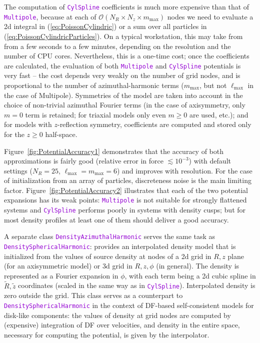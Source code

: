 \documentclass[12pt]{article}
\newcommand{\ttt}[1]{\textcolor{darkviolet}{\texttt{#1}}}
\begin{document}
The computation of \ttt{CylSpline} coefficients is much more expensive than that of \ttt{Multipole}, because at each of $\mathcal{O}(N_R\times N_z \times m_\mathrm{max})$ nodes we need to evaluate a 2d integral in (\ref{eq:PoissonCylindric}) or a sum over all particles in (\ref{eq:PoissonCylindricParticles}). On a typical workstation, this may take from from a few seconds to a few minutes, depending on the resolution and the number of CPU cores. Nevertheless, this is a one-time cost; once the coefficients are calculated, the evaluation of both \ttt{Multipole} and \ttt{CylSpline} potentials is very fast -- the cost depends very weakly on the number of grid nodes, and is proportional to the number of azimuthal-harmonic terms ($m_\mathrm{max}$, but not $\ell_\mathrm{max}$ in the case of Multipole).
Symmetries of the model are taken into account in the choice of non-trivial azimuthal Fourier terms (in the case of axisymmetry, only $m=0$ term is retained; for triaxial models only even $m\ge 0$ are used, etc.); and for models with $z$-reflection symmetry, coefficients are computed and stored only for the $z\ge 0$ half-space.

Figure~\ref{fig:PotentialAccuracy1} demonstrates that the accuracy of both approximations is fairly good (relative error in force $\lesssim 10^{-3}$) with default settings ($N_R=25$, $\ell_\mathrm{max}=m_\mathrm{max}=6$) and improves with resolution. For the case of initialization from an array of particles, discreteness noise is the main limiting factor.
Figure~\ref{fig:PotentialAccuracy2} illustrates that each of the two potential expansions has its weak points: \ttt{Multipole} is not suitable for strongly flattened systems and \ttt{CylSpline} performs poorly in systems with density cusps; but for most density profiles at least one of them should deliver a good accuracy.

\label{sec:DensityAzimuthalHarmonic} A separate class \ttt{DensityAzimuthalHarmonic} serves the same task as \ttt{Density\-Spherical\-Harmonic}: provides an interpolated density model that is initialized from the values of source density at nodes of a 2d grid in $R,z$ plane (for an axisymmetric model) or 3d grid in $R,z,\phi$ (in general). The density is represented as a Fourier expansion in $\phi$, with each term being a 2d cubic spline in $\tilde R, \tilde z$ coordinates (scaled in the same way as in \ttt{CylSpline}). Interpolated density is zero outside the grid. This class serves as a counterpart to \ttt{DensitySphericalHarmonic} in the context of DF-based self-consistent models for disk-like components: the values of density at grid nodes are computed by (expensive) integration of DF over velocities, and density in the entire space, necessary for computing the potential, is given by the interpolator.
\end{document}
